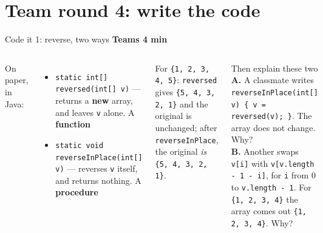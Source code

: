 \documentclass[aspectratio=169]{beamer}
\newcommand{\code}[1]{\texttt{#1}}
\newcommand{\timing}[2]{\hfill{\small\textcolor{bkblue}{\textbf{#1 \textbullet{} #2}}}}
\begin{document}
\section{Team round 4: write the code}

\begin{frame}[fragile]{Code it 1: reverse, two ways \timing{Teams}{4 min}}
  \begin{columns}[T,onlytextwidth]
    On paper, in Java:
    \begin{itemize}[itemsep=0.3em]
      \small
      \item \code{static int[] reversed(int[] v)} --- returns a \textbf{new} array, and
        leaves \code{v} alone. A \textbf{function}
      \item \code{static void reverseInPlace(int[] v)} --- reverses \code{v} itself, and
        returns nothing. A \textbf{procedure}
    \end{itemize}
    \vspace{0.3em}
    {\small For \code{\{1, 2, 3, 4, 5\}}: \code{reversed} gives \code{\{5, 4, 3, 2, 1\}}
    and the original is unchanged; after \code{reverseInPlace}, the original \emph{is}
    \code{\{5, 4, 3, 2, 1\}}.}
    \begin{discussionbox}{Then explain these two}
      \small
      \textbf{A.} A classmate writes
      \code{reverseInPlace(int[] v) \{ v = reversed(v); \}}. The array does not change.
      Why?\\[0.4em]
      \textbf{B.} Another swaps \code{v[i]} with \code{v[v.length - 1 - i]}, for
      \code{i} from 0 to \code{v.length - 1}. For \code{\{1, 2, 3, 4\}} the array comes out
      \code{\{1, 2, 3, 4\}}. Why?
    \end{discussionbox}
  \end{columns}
\end{frame}
\end{document}
